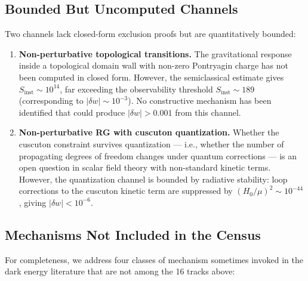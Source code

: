 \subsection{Bounded But Uncomputed Channels}
\label{sec:3-bounded}

Two channels lack closed-form exclusion proofs but are quantitatively bounded:

\begin{enumerate}
  \item \textbf{Non-perturbative topological transitions.} The gravitational response inside a topological domain wall with non-zero Pontryagin charge has not been computed in closed form. However, the semiclassical estimate gives $S_{\mathrm{inst}} \sim 10^{14}$, far exceeding the observability threshold $S_{\mathrm{inst}} \sim 189$ (corresponding to $|\delta w| \sim 10^{-3}$). No constructive mechanism has been identified that could produce $|\delta w| > 0.001$ from this channel.

  \item \textbf{Non-perturbative RG with cuscuton quantization.} Whether the cuscuton constraint survives quantization --- i.e., whether the number of propagating degrees of freedom changes under quantum corrections --- is an open question in scalar field theory with non-standard kinetic terms. However, the quantization channel is bounded by radiative stability: loop corrections to the cuscuton kinetic term are suppressed by $(H_0/\mu)^2 \sim 10^{-44}$, giving $|\delta w| < 10^{-6}$.
\end{enumerate}

\subsection{Mechanisms Not Included in the Census}
\label{sec:3-omitted}

For completeness, we address four classes of mechanism sometimes invoked in the dark energy literature that are not among the 16 tracks above:

